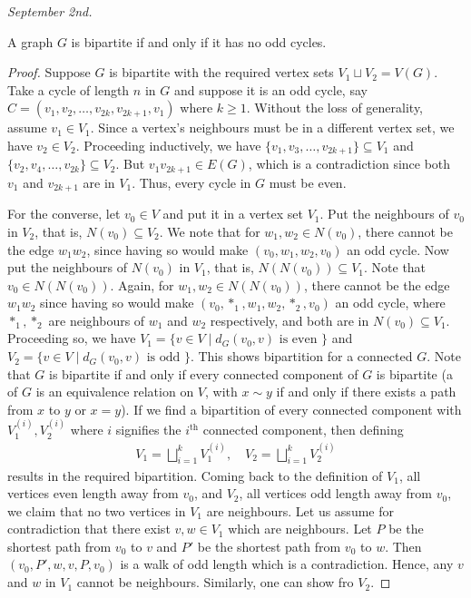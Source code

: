 \textit{September 2nd.}

\begin{theorem}
    A graph $G$ is bipartite if and only if it has no odd cycles.
\end{theorem}
\begin{proof}
    Suppose $G$ is bipartite with the required vertex sets $V_{1} \sqcup V_{2} = V(G)$. Take a cycle of length $n$ in $G$ and suppose it is an odd cycle, say $C = (v_{1},v_{2},\ldots,v_{2k},v_{2k+1},v_{1})$ where $k \geq 1$. Without the loss of generality, assume $v_{1} \in V_{1}$. Since a vertex's neighbours must be in a different vertex set, we have $v_{2} \in V_{2}$. Proceeding inductively, we have $\{v_{1},v_{3},\ldots,v_{2k+1}\} \subseteq V_{1}$ and $\{v_{2},v_{4},\ldots,v_{2k}\} \subseteq V_{2}$. But $v_{1}v_{2k+1} \in E(G)$, which is a contradiction since both $v_{1}$ and $v_{2k+1}$ are in $V_{1}$. Thus, every cycle in $G$ must be even.

    For the converse, let $v_{0} \in V$ and put it in a vertex set $V_{1}$. Put the neighbours of $v_{0}$ in $V_{2}$, that is, $N(v_{0}) \subseteq V_{2}$. We note that for $w_{1},w_{2} \in N(v_{0})$, there cannot be the edge $w_{1}w_{2}$, since having so would make $(v_{0},w_{1},w_{2},v_{0})$ an odd cycle. Now put the neighbours of $N(v_{0})$ in $V_{1}$, that is, $N(N(v_{0})) \subseteq V_{1}$. Note that $v_{0} \in N(N(v_{0}))$. Again, for $w_{1},w_{2} \in N(N(v_{0}))$, there cannot be the edge $w_{1}w_{2}$ since having so would make $(v_{0},\ast_{1},w_{1},w_{2},\ast_{2},v_{0})$ an odd cycle, where $\ast_{1},\ast_{2}$ are neighbours of $w_{1}$ and $w_{2}$ respectively, and both are in $N(v_{0}) \subseteq V_{1}$. Proceeding so, we have $V_{1} = \{v \in V \mid d_{G}(v_{0},v) \text{ is even }\}$ and $V_{2} = \{v \in V \mid d_{G}(v_{0},v) \text{ is odd }\}$. This shows bipartition for a connected $G$. Note that $G$ is bipartite if and only if every connected component of $G$ is bipartite (a  of $G$ is an equivalence relation on $V$, with $x \sim y$ if and only if there exists a path from $x$ to $y$ or $x = y$). If we find a bipartition of every connected component with $V_{1}^{(i)},V_{2}^{(i)}$ where $i$ signifies the $i^{\text{th}}$ connected component, then defining
    \begin{align}
        V_{1} = \bigsqcup_{i=1}^{k} V_{1}^{(i)},\quad V_{2} = \bigsqcup_{i=1}^{k} V_{2}^{(i)}
    \end{align}
    results in the required bipartition. Coming back to the definition of $V_{1}$, all vertices even length away from $v_{0}$, and $V_{2}$, all vertices odd length away from $v_{0}$, we claim that no two vertices in $V_{1}$ are neighbours. Let us assume for contradiction that there exist $v,w \in V_{1}$ which are neighbours. Let $P$ be the shortest path from $v_{0}$ to $v$ and $P'$ be the shortest path from $v_{0}$ to $w$. Then $(v_{0},P',w,v,P,v_{0})$ is a walk of odd length which is a contradiction. Hence, any $v$ and $w$ in $V_{1}$ cannot be neighbours. Similarly, one can show fro $V_{2}$.
\end{proof}

